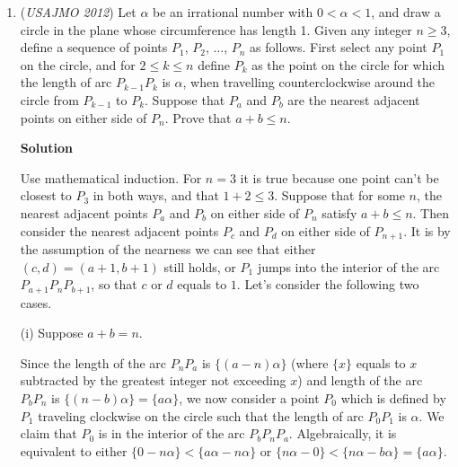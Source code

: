 \begin{enumerate}
 


 



\textbf{Solution 6}

$LHS=\sum_{cyc}\frac{a^3+3b^3}{5a+b}=\sum_{cyc}\frac{a^3}{5a+b}+\sum_{cyc}\frac{3b^3}{5a+b}=\sum_{cyc}\frac{a^4}{5a^2+ab}+\sum_{cyc}\frac{9b^4}{15ab+3b^2}$ which tells that $LHS\geq \frac{(a^2+b^2+c^2)^2}{5(a^2+b^2+c^2)+ab+bc+ac}+\frac{3(a^2+b^2+c^2)}{(a^2+b^2+c^2)+5(ab+bc+ac)}\geq (\frac{1}{2}+\frac{1}{6})(a^2+b^2+c^2)=RHS$, our proof is done

 


	\item (\textit{USAJMO 2012}) Let $\alpha$ be an irrational number with $0 < \alpha < 1$, and draw a circle in the plane whose circumference has length 1.  Given any integer $n \ge 3$, define a sequence of points $P_1$, $P_2$, $\dots$, $P_n$ as follows.  First select any point $P_1$ on the circle, and for $2 \le k \le n$ define $P_k$ as the point on the circle for which the length of arc $P_{k - 1} P_k$ is $\alpha$, when travelling counterclockwise around the circle from $P_{k - 1}$ to $P_k$.  Suppose that $P_a$ and $P_b$ are the nearest adjacent points on either side of $P_n$.  Prove that $a + b \le n$.


 



\textbf{Solution}

Use mathematical induction. For $n=3$ it is true because one point can't be closest to $P_3$ in both ways, and that $1+2\le 3$. Suppose that for some $n$, the nearest adjacent points $P_a$ and $P_b$ on either side of $P_n$ satisfy  $a+b \le n$. Then consider the nearest adjacent points $P_c$ and $P_d$ on either side of $P_{n+1}$. It is by the assumption of the nearness we can see that either $(c,d)=(a+1,b+1)$ still holds, or $P_1$ jumps into the interior of the arc $P_{a+1}P_{n}P_{b+1}$, so that $c$ or $d$ equals to $1$. Let's consider the following two cases.

 (i) Suppose $a+b=n$.

 Since the length of the arc $P_nP_a$ is $\{(a-n)\alpha\}$ (where $\{x\}$ equals to $x$ subtracted by the greatest integer not exceeding $x$) and length of the arc $P_bP_n$ is $\{(n-b)\alpha\} = \{a\alpha\}$, we now consider a point $P_0$ which is defined by $P_1$ traveling clockwise on the circle such that the length of arc $P_0P_1$ is $\alpha$. We claim that $P_0$ is in the interior of the arc $P_bP_nP_a$. Algebraically, it is equivalent to either $\{0-n\alpha\} < \{a\alpha-n\alpha\}$ or $\{n\alpha -0 \} < \{n\alpha - b\alpha\} = \{a\alpha\}$.


\end{enumerate}
